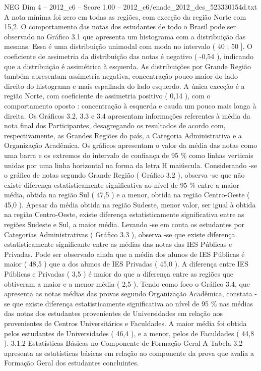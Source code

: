 \begin{textsample}{NEG Dim 4 – 2012\_c6 – Score 1.00 – 2012\_c6/enade\_2012\_des\_523330154d.txt}
A nota mínima foi zero em todas as regiões, com exceção da região Norte com 15,2.
O comportamento das notas dos estudantes de todo o Brasil pode ser observado no Gráfico 3.1 que apresenta um histograma com a distribuição das mesmas.
Essa é uma distribuição unimodal com moda no intervalo ( 40 ; 50 ].
O coeficiente de assimetria da distribuição das notas é negativo ( -0,54 ), indicando que a distribuição é assimétrica à esquerda.
As distribuições por Grande Região também apresentam assimetria negativa, concentração pouco maior do lado direito do histograma e mais espalhada do lado esquerdo.
A única exceção é a região Norte, com coeficiente de assimetria positivo ( 0,14 ), com o comportamento oposto : concentração à esquerda e cauda um pouco mais longa à direita.
Os Gráficos 3.2, 3.3 e 3.4 apresentam informações referentes à média da nota final dos Participantes, desagregando os resultados de acordo com, respectivamente, as Grandes Regiões do país, a Categoria Administrativa e a Organização Acadêmica.
Os gráficos apresentam o valor da média das notas como uma barra e os extremos do intervalo de confiança de 95 \% como linhas verticais unidas por uma linha horizontal na forma da letra H maiúscula.
Considerando -se o gráfico de notas segundo Grande Região ( Gráfico 3.2 ), observa -se que não existe diferença estatisticamente significativa ao nível de 95 \% entre a maior média, obtida na região Sul ( 47,5 ) e a menor, obtida na região Centro-Oeste ( 45,0 ).
Apesar da média obtida na região Sudeste, menor valor, ser igual à obtida na região Centro-Oeste, existe diferença estatisticamente significativa entre as regiões Sudeste e Sul, a maior média.
Levando -se em conta os estudantes por Categorias Administrativas ( Gráfico 3.3 ), observa -se que existe diferença estatisticamente significante entre as médias das notas das IES Públicas e Privadas.
Pode ser observado ainda que a média dos alunos de IES Públicas é maior ( 48,5 ) que a dos alunos de IES Privadas ( 45,0 ).
A diferença entre IES Públicas e Privadas ( 3,5 ) é maior do que a diferença entre as regiões que obtiveram a maior e a menor média ( 2,5 ).
Tendo como foco o Gráfico 3.4, que apresenta as notas médias das provas segundo Organização Acadêmica, constata -se que existe diferença estatisticamente significativa ao nível de 95 \% nas médias das notas dos estudantes provenientes de Universidades em relação aos provenientes de Centros Universitários e Faculdades.
A maior média foi obtida pelos estudantes de Universidades ( 46,4 ), e a menor, pelos de Faculdades ( 44,8 ). 3.1.2 Estatísticas Básicas no Componente de Formação Geral A Tabela 3.2 apresenta as estatísticas básicas em relação ao componente da prova que avalia a Formação Geral dos estudantes concluintes.

\end{textsample}
